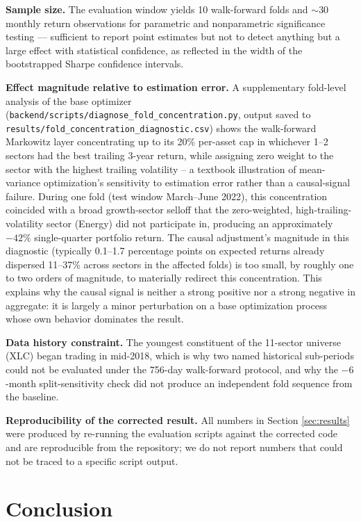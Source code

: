 \documentclass[10pt,twocolumn]{article}
\begin{document}
\textbf{Sample size.} The evaluation window yields 10 walk-forward folds
and $\sim$30 monthly return observations for parametric and
nonparametric significance testing --- sufficient to report point
estimates but not to detect anything but a large effect with
statistical confidence, as reflected in the width of the bootstrapped
Sharpe confidence intervals.

\textbf{Effect magnitude relative to estimation error.} A supplementary
fold-level analysis of the base optimizer
(\texttt{backend/scripts/diagnose\_fold\_concentration.py}, output saved to
\texttt{results/fold\_concentration\_diagnostic.csv}) shows the
walk-forward Markowitz layer concentrating up to its 20\% per-asset cap in
whichever 1--2 sectors had the best trailing 3-year return, while
assigning zero weight to the sector with the highest trailing volatility
-- a textbook illustration of mean-variance optimization's sensitivity to
estimation error rather than a causal-signal failure. During one fold
(test window March--June 2022), this concentration coincided with a broad
growth-sector selloff that the zero-weighted, high-trailing-volatility
sector (Energy) did not participate in, producing an approximately
$-42\%$ single-quarter portfolio return. The causal adjustment's
magnitude in this diagnostic (typically 0.1--1.7 percentage points on
expected returns already dispersed 11--37\% across sectors in the
affected folds) is too small, by roughly one to two orders of magnitude,
to materially redirect this concentration. This explains why the causal
signal is neither a strong positive nor a strong negative in aggregate:
it is largely a minor perturbation on a base optimization process whose
own behavior dominates the result.

\textbf{Data history constraint.} The youngest constituent of the
11-sector universe (XLC) began trading in mid-2018, which is why two
named historical sub-periods could not be evaluated under the
756-day walk-forward protocol, and why the $-6$-month split-sensitivity
check did not produce an independent fold sequence from the baseline.

\textbf{Reproducibility of the corrected result.} All numbers in Section
\ref{sec:results} were produced by re-running the evaluation scripts
against the corrected code and are reproducible from the repository;
we do not report numbers that could not be traced to a specific script
output.

\section{Conclusion}
\end{document}
